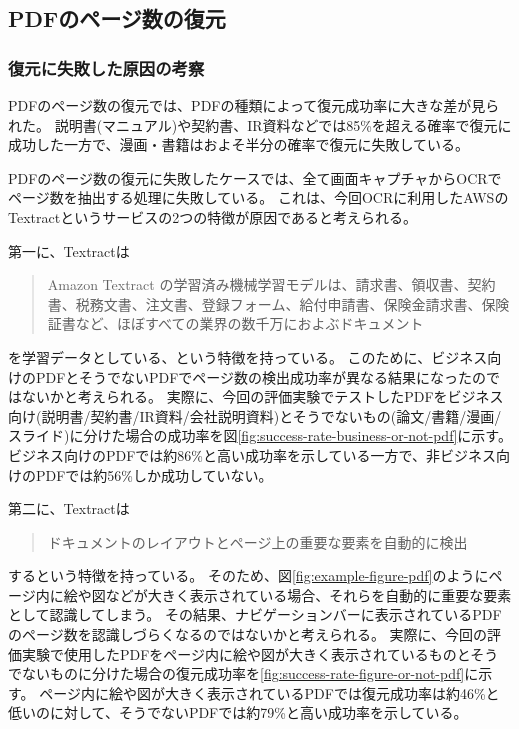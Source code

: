 
\subsection{PDFのページ数の復元}

\subsubsection{復元に失敗した原因の考察}
PDFのページ数の復元では、PDFの種類によって復元成功率に大きな差が見られた。
説明書(マニュアル)や契約書、IR資料などでは85\%を超える確率で復元に成功した一方で、漫画・書籍はおよそ半分の確率で復元に失敗している。

PDFのページ数の復元に失敗したケースでは、全て画面キャプチャからOCRでページ数を抽出する処理に失敗している。
これは、今回OCRに利用したAWSのTextractというサービスの2つの特徴が原因であると考えられる。

第一に、Textractは
\begin{quote}
Amazon Textract の学習済み機械学習モデルは、請求書、領収書、契約書、税務文書、注文書、登録フォーム、給付申請書、保険金請求書、保険証書など、ほぼすべての業界の数千万におよぶドキュメント
\end{quote}
を学習データとしている、という特徴を持っている\cite{}。
このために、ビジネス向けのPDFとそうでないPDFでページ数の検出成功率が異なる結果になったのではないかと考えられる。
実際に、今回の評価実験でテストしたPDFをビジネス向け(説明書/契約書/IR資料/会社説明資料)とそうでないもの(論文/書籍/漫画/スライド)に分けた場合の成功率を図\ref{fig:success-rate-business-or-not-pdf}に示す。
ビジネス向けのPDFでは約86\%と高い成功率を示している一方で、非ビジネス向けのPDFでは約56\%しか成功していない。

第二に、Textractは
\begin{quote}
ドキュメントのレイアウトとページ上の重要な要素を自動的に検出
\end{quote}
するという特徴を持っている。
そのため、図\ref{fig:example-figure-pdf}\cite{}のようにページ内に絵や図などが大きく表示されている場合、それらを自動的に重要な要素として認識してしまう。
その結果、ナビゲーションバーに表示されているPDFのページ数を認識しづらくなるのではないかと考えられる。
実際に、今回の評価実験で使用したPDFをページ内に絵や図が大きく表示されているものとそうでないものに分けた場合の復元成功率を\ref{fig:success-rate-figure-or-not-pdf}に示す。
ページ内に絵や図が大きく表示されているPDFでは復元成功率は約46\%と低いのに対して、そうでないPDFでは約79\%と高い成功率を示している。

